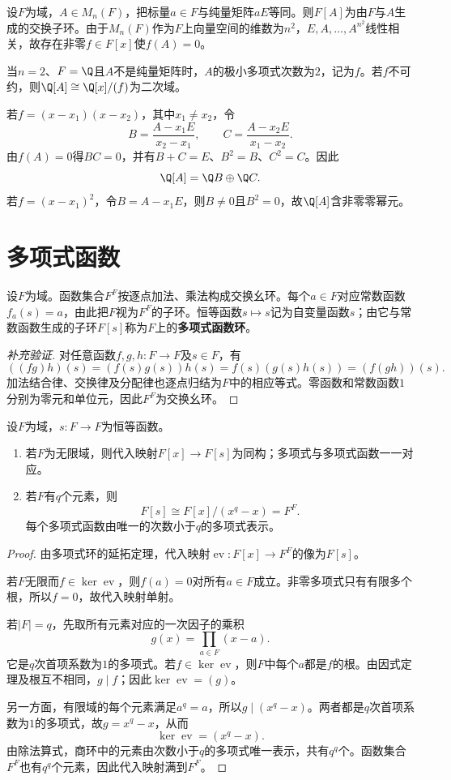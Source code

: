\begin{example}
设$F$为域，$A\in M_n(F)$，把标量$a\in F$与纯量矩阵$aE$等同。则$F[A]$为由$F$与$A$生成的交换子环。由于$M_n(F)$作为$F$上向量空间的维数为$n^2$，$E,A,\ldots,A^{n^2}$线性相关，故存在非零$f\in F[x]$使$f(A)=0$。

当$n=2$、$F=\Q$且$A$不是纯量矩阵时，$A$的极小多项式次数为$2$，记为$f$。若$f$不可约，则$\Q[A]\cong\Q[x]/(f)$为二次域。

若$f=(x-x_1)(x-x_2)$，其中$x_1\ne x_2$，令
\[
B=\frac{A-x_1E}{x_2-x_1},\qquad
C=\frac{A-x_2E}{x_1-x_2}.
\]
由$f(A)=0$得$BC=0$，并有$B+C=E$、$B^2=B$、$C^2=C$。因此
\[
\Q[A]=\Q B\oplus\Q C.
\]
若$f=(x-x_1)^2$，令$B=A-x_1E$，则$B\ne0$且$B^2=0$，故$\Q[A]$含非零零幂元。
\end{example}

\section{多项式函数}

设$F$为域。函数集合$F^F$按逐点加法、乘法构成交换幺环。每个$a\in F$对应常数函数$f_a(s)=a$，由此把$F$视为$F^F$的子环。恒等函数$s\mapsto s$记为自变量函数$s$；由它与常数函数生成的子环$F[s]$称为$F$上的\textbf{多项式函数环}。
\begin{proof}[补充验证]
对任意函数$f,g,h:F\to F$及$s\in F$，有
\[
((fg)h)(s)=(f(s)g(s))h(s)=f(s)(g(s)h(s))=(f(gh))(s).
\]
加法结合律、交换律及分配律也逐点归结为$F$中的相应等式。零函数和常数函数$1$分别为零元和单位元，因此$F^F$为交换幺环。
\end{proof}

\begin{theorem}\label{p2:poly-functions-one}
设$F$为域，$s:F\to F$为恒等函数。
\begin{enumerate}
\item 若$F$为无限域，则代入映射$F[x]\to F[s]$为同构；多项式与多项式函数一一对应。
\item 若$F$有$q$个元素，则
\[
F[s]\cong F[x]/(x^q-x)=F^F.
\]
每个多项式函数由唯一的次数小于$q$的多项式表示。
\end{enumerate}
\end{theorem}
\begin{proof}
由多项式环的延拓定理，代入映射$\operatorname{ev}:F[x]\to F^F$的像为$F[s]$。

若$F$无限而$f\in\ker\operatorname{ev}$，则$f(a)=0$对所有$a\in F$成立。非零多项式只有有限多个根，所以$f=0$，故代入映射单射。

若$|F|=q$，先取所有元素对应的一次因子的乘积
\[
g(x)=\prod_{a\in F}(x-a).
\]
它是$q$次首项系数为$1$的多项式。若$f\in\ker\operatorname{ev}$，则$F$中每个$a$都是$f$的根。由因式定理及根互不相同，$g\mid f$；因此$\ker\operatorname{ev}=(g)$。

另一方面，有限域的每个元素满足$a^q=a$，所以$g\mid(x^q-x)$。两者都是$q$次首项系数为$1$的多项式，故$g=x^q-x$，从而
\[
\ker\operatorname{ev}=(x^q-x).
\]
由除法算式，商环中的元素由次数小于$q$的多项式唯一表示，共有$q^q$个。函数集合$F^F$也有$q^q$个元素，因此代入映射满到$F^F$。
\end{proof}

